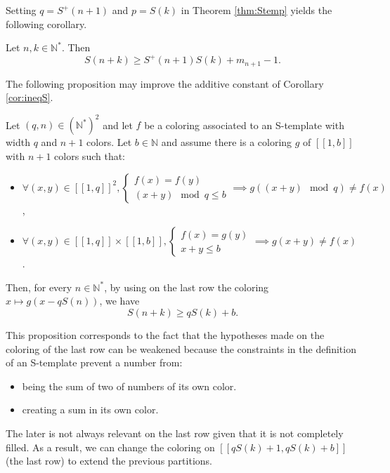 Setting \(q = S^+(n+1)\) and \(p = S(k)\) in Theorem \ref{thm:Stemp} yields the following corollary.

\begin{corollary}
\label{cor:ineqS}
	Let \(n, k \in \mathbb{N}^*\). Then
	\[ S(n+k) \geqslant S^+(n+1)S(k) + m_{n+1} - 1.\]
\end{corollary}

The following proposition may improve the additive constant of Corollary \ref{cor:ineqS}.

\begin{proposition}
\label{prop:rafStemp}
Let \((q, n) \in \left(\mathbb{N}^* \right)^2\) and let \(f\) be a coloring associated to an S-template with width \(q\) and \(n+1\) 
colors. Let \(b \in \mathbb{N}\) and assume there is a coloring \(g\) of 
\([\![1, b]\!]\) with \(n+1\) colors such that:
	
\begin{itemize}
\item \(\forall (x, y) \in [\![1, q]\!]^2, \left\{
	\begin{array}{l}
		f(x) = f(y) \\
		(x + y) \mod q \leqslant b
	\end{array}
	\right. \implies g((x + y) \mod q) \neq f(x)\),
\item \(\forall (x, y) \in [\![1, q]\!] \times  [\![1, b]\!],  \left\{
	\begin{array}{l}
		f(x) = g(y) \\
		x + y \leqslant b
	\end{array}
	\right. \implies g(x + y) \neq f(x)\).
\end{itemize}
	
Then, for every \(n \in \mathbb{N}^*\), by using on the last row the coloring \(x \longmapsto g(x - q S(n))\), we have
\[ S(n+k) \geqslant q S(k) + b.\]
\end{proposition}
This proposition corresponds to the fact that the hypotheses made on the coloring of the last row can be weakened because 
the constraints in the definition of an S-template prevent a number from: 
\begin{itemize}
\item being the sum of two of numbers of its own color. 
\item creating a sum in its own color. 
\end{itemize}
The later is not always relevant on the last row given that it is not completely filled.
As a result, we can change the coloring on \([\![ q S(k) + 1,  q S(k) + b]\!]\) (the last row) to extend the previous partitions.
\newline

